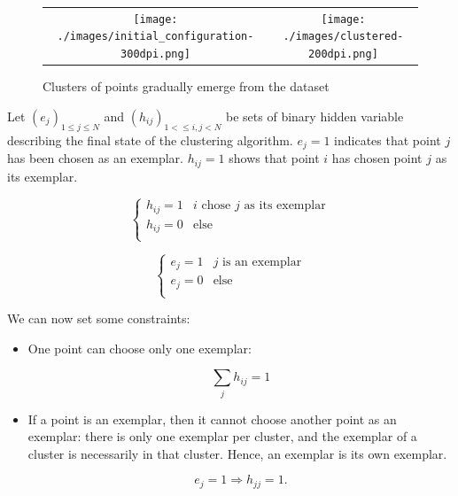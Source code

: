 \documentclass{ipol}
\begin{document}
\begin{figure}
\begin{tabular}{cc}
\texttt{[image: ./images/initial\_configuration-300dpi.png]} &
\texttt{[image: ./images/clustered-200dpi.png]} \\
\end{tabular}
\caption{Clusters of points gradually emerge from the dataset}
\end{figure}

Let $(e_j)_{1 \leq j \leq N}$ and $(h_{ij})_{1 < \leq i, j < N}$ be sets of
binary hidden variable describing the final state of the clustering algorithm.
$e_j = 1$ indicates that point $j$ has been chosen as an exemplar. $h_{ij} =
1$ shows that point $i$ has chosen point $j$ as its exemplar. 

\begin{equation*}
\begin{cases}
  h_{ij} = 1 & \text{$i$ chose $j$ as its exemplar}\\
  h_{ij} = 0 & \text{else} \\
\end{cases}
\end{equation*}

\begin{equation*}
\begin{cases}
e_j = 1 & \text{$j$ is an exemplar} \\
e_j = 0 & \text{else} \\
\end{cases}
\end{equation*}

We can now set some constraints:

\begin{itemize}
\item One point can choose only one exemplar:

\begin{equation}
\sum_j h_{ij} = 1
\end{equation}

\item If a point is an exemplar, then it cannot choose another point as an
exemplar: there is only one exemplar per cluster, and the exemplar of a
cluster is necessarily in that cluster. Hence, an exemplar is its own
exemplar.

\begin{equation*}
e_{j} = 1 \Rightarrow h_{jj} = 1.
\end{equation*}
\end{itemize}
\end{document}
